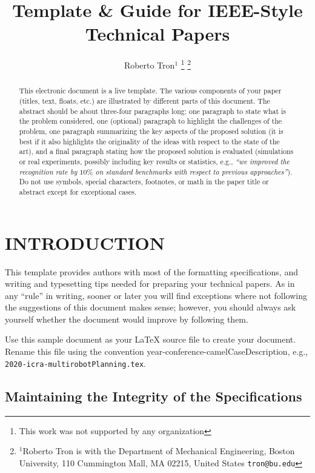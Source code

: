 \documentclass[letterpaper, 10 pt, conference]{ieeeconf}
\title{\LARGE \bf
Template \& Guide for IEEE-Style Technical Papers
}
\author{Roberto Tron$^{1}$%
\thanks{This work was not supported by any organization}%
\thanks{$^{1}$Roberto Tron is with the Department of Mechanical Engineering,
        Boston University, 110 Cummington Mall, MA 02215, United States
        {\tt\small tron@bu.edu}}%
}
\begin{document}
\maketitle
\thispagestyle{empty}
\pagestyle{empty}


\begin{abstract}

  This electronic document is a live template. The various components of your paper (titles, text, floats, etc.) are illustrated by different parts of this document.
  The abstract should be about three-four paragraphs long: one paragraph to state what is the problem considered, one (optional) paragraph to highlight the challenges of the problem, one paragraph summarizing the key aspects of the proposed solution (it is best if it also highlights the originality of the ideas with respect to the state of the art), and a final paragraph stating how the proposed solution is evaluated (simulations or real experiments, possibly including key results or statistics, e.g., \emph{``we improved the recognition rate by $10\%$ on standard benchmarks with respect to previous approaches''}).
  Do not use symbols, special characters, footnotes, or math in the paper title or abstract except for exceptional cases.
\end{abstract}


\section{INTRODUCTION}

This template provides authors with most of the formatting specifications, and writing and typesetting tips needed for preparing your technical papers.
As in any ``rule'' in writing, sooner or later you will find exceptions where not following the suggestions of this document makes sense; however, you should always ask yourself whether the document would improve by following them.

Use this sample document as your LaTeX source file to create your document. Rename this file using the convention year-conference-camelCaseDescription, e.g., \texttt{2020-icra-multirobotPlanning.tex}.

\subsection{Maintaining the Integrity of the Specifications}
\end{document}
